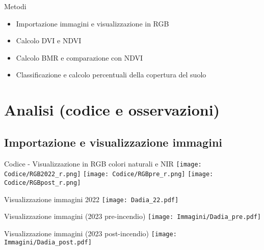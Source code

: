 \documentclass{beamer}
\begin{document}
\begin{frame}{Metodi}
    \begin{itemize}[label=$\bullet$]
        \item Importazione immagini e visualizzazione in RGB
        \item \pause Calcolo DVI e NDVI
        \item \pause Calcolo BMR e comparazione con NDVI
        \item  \pause Classificazione e calcolo percentuali della copertura del suolo 
         
        
    \end{itemize}

\end{frame}

\section{Analisi (codice e osservazioni)}

\subsection{Importazione e visualizzazione immagini}


\begin{frame}{Codice - Visualizzazione in RGB colori naturali e NIR}
\texttt{[image: Codice/RGB2022\_r.png]}
\centering
\texttt{[image: Codice/RGBpre\_r.png]}
\centering
\texttt{[image: Codice/RGBpost\_r.png]}
\centering
\end{frame}


\begin{frame}{Visualizzazione immagini 2022}
\texttt{[image: Dadia\_22.pdf]}
\caption{\textit{Colori naturali} (sinistra), \textit{NIR} (destra)}
\centering  
\end{frame}



\begin{frame}{Visualizzazione immagini (2023 pre-incendio)}
 \texttt{[image: Immagini/Dadia\_pre.pdf]}
 \caption{\textit{Colori naturali} (sinistra), \textit{NIR} (destra)}
 \centering
 
\end{frame}

\begin{frame}{Visualizzazione immagini (2023 post-incendio)}
 \texttt{[image: Immagini/Dadia\_post.pdf]}
 \caption{\textit{Colori naturali} (sinistra), \textit{NIR} (destra)}
 \centering
\end{frame}
\end{document}
